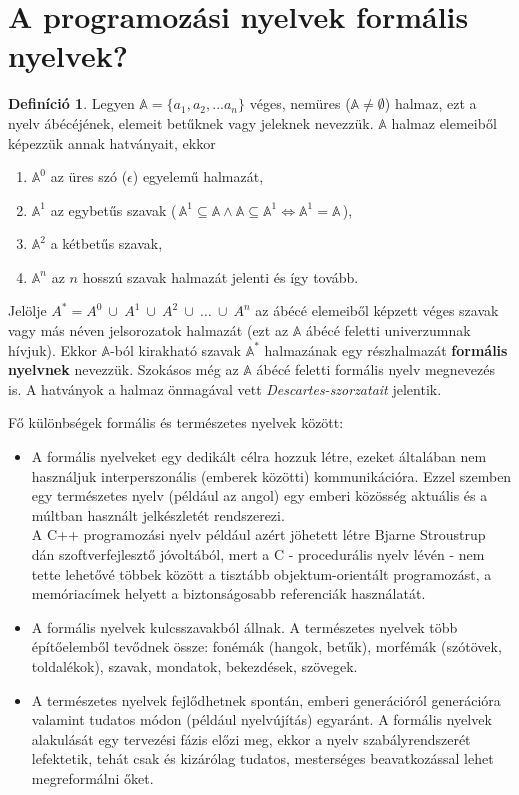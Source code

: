 \documentclass[tocnopagenum]{thesis-ekf}
\theoremstyle{definition}
\newtheorem{definicio}[tetel]{Definíció}
\theoremstyle{remark}
\begin{document}
	\section{A programozási nyelvek formális nyelvek?}
	\begin{definicio}
		Legyen $\mathbb{A} = \{a_1, a_2, ... a_n\}$ véges, nemüres ($ \mathbb{A} \neq \emptyset$) halmaz, ezt a nyelv ábécéjének, elemeit betűknek vagy jeleknek nevezzük. $\mathbb{A}$ halmaz elemeiből képezzük annak hatványait, ekkor 
		\begin{enumerate}
			\item $\mathbb{A} ^ {0}$ az üres szó ($\epsilon$) egyelemű halmazát, 
			\item $\mathbb{A} ^ {1} $ az egybetűs szavak (\,$\mathbb{A}^{1}\subseteq\mathbb{A}\wedge\mathbb{A}\subseteq\mathbb{A}^{1} \iff \mathbb{A}^{1}=\mathbb{A}$\,), 
			\item $\mathbb{A}^{2}$ a kétbetűs szavak, 
			\item $\mathbb{A}^{n}$ az $n$ hosszú szavak halmazát jelenti és így tovább.
		\end{enumerate}
	Jelölje $A^{*}=A^{0}\ \cup\ A^{1}\ \cup\ A^{2}\ \cup\ \dots\ \cup\  A^{n}$ az ábécé elemeiből képzett véges szavak vagy más néven jelsorozatok halmazát (ezt az $\mathbb{A}$ ábécé feletti univerzumnak hívjuk). Ekkor  $\mathbb{A}$-ból kirakható szavak $\mathbb{A}^{*}$ halmazának egy részhalmazát \textbf{formális nyelvnek} nevezzük. Szokásos még az $\mathbb{A}$ ábécé feletti formális nyelv megnevezés is. A hatványok a halmaz önmagával vett \emph{Descartes-szorzatait} jelentik.
	\cite{formnyelvek}
	\end{definicio}
	
	Fő különbségek formális és természetes nyelvek között:
	\begin{itemize}
		\item A formális nyelveket egy dedikált célra hozzuk létre, ezeket általában nem használjuk interperszonális (emberek közötti) kommunikációra. Ezzel szemben egy természetes nyelv (például az angol) egy emberi közösség aktuális és a múltban használt jelkészletét rendszerezi.\\
		A C++ programozási nyelv például azért jöhetett létre Bjarne Stroustrup dán szoftverfejlesztő jóvoltából, mert a C - procedurális nyelv lévén - nem tette lehetővé többek között a tisztább objektum-orientált programozást, a memóriacímek helyett a biztonságosabb referenciák használatát. \cite{cpplang1}
		\item A formális nyelvek kulcsszavakból állnak. A természetes nyelvek több építőelemből tevődnek össze: fonémák (hangok, betűk), morfémák (szótövek, toldalékok), szavak, mondatok, bekezdések, szövegek.
		\item A természetes nyelvek fejlődhetnek spontán, emberi generációról generációra valamint tudatos módon (például nyelvújítás) egyaránt. A formális nyelvek alakulását egy tervezési fázis előzi meg, ekkor a nyelv szabályrendszerét lefektetik, tehát csak és kizárólag tudatos, mesterséges beavatkozással lehet megreformálni őket.
	\end{itemize} \cite{langvid1} \cite{langvid2}
\end{document}
